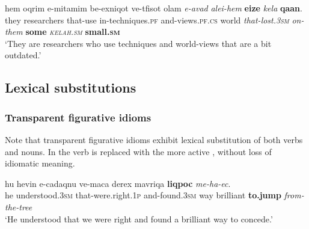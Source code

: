 \documentclass[output=paper]{langsci/langscibook}
\begin{document}
    \ea\label{she:kelax-ins-int-mod-quant}
        \gll hem {\het}oqrim {\shin}e-mi{\shin}tam{\shin}im be-{\tet}exniqot ve-tfisot {\ayin}olam \textit{{\shin}e-{\alef}avad} \textit{{\ayin}alei-hem} \textbf{{\alef}eize} \textit{kela{\het}} \textbf{qa{\tetB}an}.\\
            they researchers that-use in-techniques.\textsc{pf} and-views.\textsc{pf.cs} world \textit{that-lost.\textsc{3sm}} \textit{on-them} \textbf{some} \textit{\textsc{kelah}.\textsc{sm}} \textbf{small.\textsc{sm}}\\
        \glt `They are researchers who use techniques and world-views that are a bit outdated.'
    \z



\subsection{Lexical substitutions}
\label{she:sec:ls}
\subsubsection{Transparent figurative idioms}
Note that transparent figurative idioms exhibit lexical substitution of both verbs and nouns. In  the verb  is replaced with the more active , without loss of idiomatic meaning.

    \ea\label{she:ec-sub-verb}
        \gll hu hevin {\shin}e-cadaqnu ve-maca derex mavriqa \textbf{liqpoc} \textit{me-ha-{\ayin}ec}.\\
            he understood.\textsc{3sm} that-were.right.\textsc{1p} and-found.\textsc{3sm} way brilliant \textbf{to.jump} \textit{from-the-tree}\\
        \glt `He understood that we were right and found a brilliant way to concede.'
    \z
\end{document}
